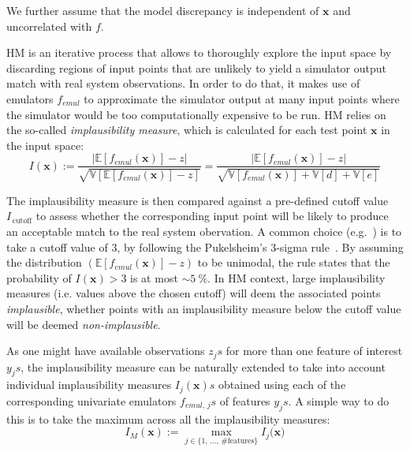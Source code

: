 \noindent
We further assume that the model discrepancy is independent of $\mathbf{x}$ and uncorrelated with $f$.

\vspace{0.2cm}
HM is an iterative process that allows to thoroughly explore the input space by discarding regions of input points that are unlikely to yield a simulator output match with real system observations. In order to do that, it makes use of emulators $f_{emul}$ to approximate the simulator output at many input points where the simulator would be too computationally expensive to be run. HM relies on the so-called \textit{implausibility measure}, which is calculated for each test point $\mathbf{x}$ in the input space:
%
\begin{equation}\label{eq:implmeasure}
    I(\mathbf{x}) := \frac{\lvert\mathbb{E}[f_{emul}(\mathbf{x})]-z\rvert}{\sqrt{\mathbb{V}[\mathbb{E}[f_{emul}(\mathbf{x})]-z]}} = \frac{\lvert\mathbb{E}[f_{emul}(\mathbf{x})]-z\rvert}{\sqrt{\mathbb{V}[f_{emul}(\mathbf{x})] + \mathbb{V}[d] + \mathbb{V}[e]}}
\end{equation}

\noindent
The implausibility measure is then compared against a pre-defined cutoff value $I_{\,\text{cutoff}}$ to assess whether the corresponding input point will be likely to produce an acceptable match to the real system obervation. A common choice (e.g.~\cite{Vernon:2010,Andrianakis:2015,Coveney:2018}) is to take a cutoff value of $3$, by following the Pukelsheim's $3$-sigma rule~\cite{Pukelsheim:1994}. By assuming the distribution $(\mathbb{E}[f_{emul}(\mathbf{x})]-z)$ to be unimodal, the rule states that the probability of $I(\mathbf{x})>3$ is at most $\sim\SI{5}{\percent}$. In HM context, large implausibility measures (i.e. values above the chosen cutoff) will deem the associated points \textit{implausible}, whether points with an implausibility measure below the cutoff value will be deemed \textit{non-implausible}. 

\vspace{0.2cm}
As one might have available observations $z_js$ for more than one feature of interest $y_js$, the implausibility measure can be naturally extended to take into account individual implausibility measures $I_j(\mathbf{x})s$ obtained using each of the corresponding univariate emulators $f_{emul,\,j}s$ of features $y_js$. A simple way to do this is to take the maximum across all the implausibility measures: 
%
\begin{equation}\label{eq:nonimpl}
    I_{M}(\mathbf{x}) := \max_{j\in\{1,\,\dots,\,\#\textrm{features}\}}{I_j(\mathbf{x}})
\end{equation}

